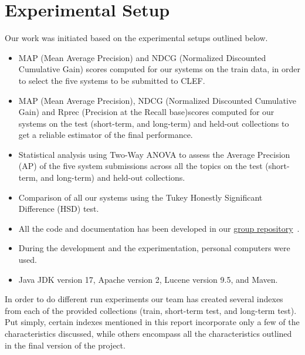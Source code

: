 \section{Experimental Setup}\label{sec:setup}

Our work was initiated based on the experimental setups outlined below.
\begin{itemize}
	\item MAP (Mean Average Precision) and NDCG (Normalized Discounted Cumulative Gain) scores computed for our systems
	on the train data, in order to select the five systems to be submitted to CLEF.
	\item MAP (Mean Average Precision), NDCG (Normalized Discounted Cumulative Gain) and Rprec (Precision at the Recall
	base)scores computed for our systems on the test (short-term, and long-term) and held-out collections to
	get a reliable estimator of the final performance.
	\item Statistical analysis using Two-Way ANOVA to assess the Average Precision (AP) of the five system submissions
	across all the topics on the test (short-term, and long-term) and held-out collections.
	\item Comparison of all our systems using the Tukey Honestly Significant Difference (HSD) test.
	\item All the code and documentation has been developed in our
	\href{https://bitbucket.org/upd-dei-stud-prj/seupd2223-jihuming/src/master/}{group repository}~\cite{jihuming}.
	\item During the development and the experimentation, personal computers were used.
	\item Java JDK version 17, Apache version 2, Lucene version 9.5, and Maven.
\end{itemize}

In order to do different run experiments our team has created several indexes from each of the provided collections
(train, short-term test, and long-term test).
Put simply, certain indexes mentioned in this report incorporate only a few of the characteristics discussed, while
others encompass all the characteristics outlined in the final version of the project.\\

